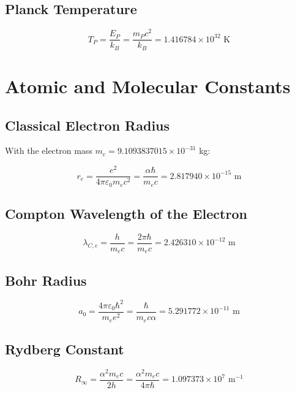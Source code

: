 \documentclass[12pt,a4paper]{article}
\theoremstyle{definition}
\begin{document}
	\subsection{Planck Temperature}
	
	\begin{equation}
		T_P = \frac{E_P}{k_B} = \frac{m_P c^2}{k_B} = 1.416784 \times 10^{32} \text{ K}
	\end{equation}
	
	\section{Atomic and Molecular Constants}
	
	\subsection{Classical Electron Radius}
	
	With the electron mass $m_e = 9.1093837015 \times 10^{-31}$ kg:
	
	\begin{equation}
		r_e = \frac{e^2}{4\pi\varepsilon_0 m_e c^2} = \frac{\alpha \hbar}{m_e c} = 2.817940 \times 10^{-15} \text{ m}
	\end{equation}
	
	\subsection{Compton Wavelength of the Electron}
	
	\begin{equation}
		\lambda_{C,e} = \frac{h}{m_e c} = \frac{2\pi\hbar}{m_e c} = 2.426310 \times 10^{-12} \text{ m}
	\end{equation}
	
	\subsection{Bohr Radius}
	
	\begin{equation}
		a_0 = \frac{4\pi\varepsilon_0\hbar^2}{m_e e^2} = \frac{\hbar}{m_e c \alpha} = 5.291772 \times 10^{-11} \text{ m}
	\end{equation}
	
	\subsection{Rydberg Constant}
	
	\begin{equation}
		R_\infty = \frac{\alpha^2 m_e c}{2h} = \frac{\alpha^2 m_e c}{4\pi\hbar} = 1.097373 \times 10^7 \text{ m}^{-1}
	\end{equation}
	
\end{document}
